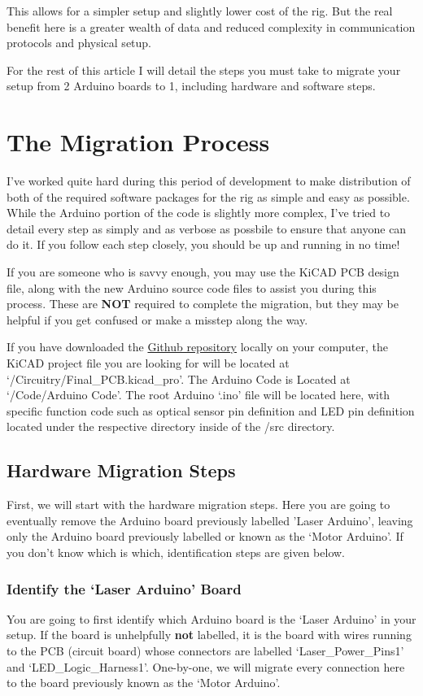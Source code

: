 \documentclass{article}
\begin{document}
This allows for a simpler setup and slightly lower cost of the rig. But the real benefit here is a greater wealth of data and reduced complexity in communication protocols and physical setup. 

For the rest of this article I will detail the steps you must take to migrate your setup from 2 Arduino boards to 1, including hardware and software steps.

\section{The Migration Process}
\label{sec:migration}
I've worked quite hard during this period of development to make distribution of both of the required software packages for the rig as simple and easy as possible. While the Arduino portion of the code is 
slightly more complex, I've tried to detail every step as simply and as verbose as possbile to ensure that anyone can do it. If you follow each step closely, you should be up and running
in no time!

If you are someone who is savvy enough, you may use the KiCAD PCB design file, along with the new Arduino source code files to assist you during this process. These are \textbf{NOT} 
required to complete the migration, but they may be helpful if you get confused or make a misstep along the way. 

If you have downloaded the \href{https://github.com/blakehourigan/Photologic-Experiment-Rig}{Github repository} locally on your computer, the KiCAD project 
file you are looking for will be located at `/Circuitry/Final\_PCB.kicad\_pro'. The Arduino Code is Located at `/Code/Arduino Code'. The root Arduino `.ino' file will be located here, 
with specific function code such as optical sensor pin definition and LED pin definition located under the respective directory inside of the /src directory.

\subsection{Hardware Migration Steps}
First, we will start with the hardware migration steps. Here you are going to eventually remove the Arduino board previously labelled 'Laser Arduino', leaving only the Arduino board previously 
labelled or known as the `Motor Arduino'. If you don't know which is which, identification steps are given below. 

\subsubsection{Identify the `Laser Arduino' Board}
You are going to first identify which Arduino board is the `Laser Arduino' in your setup. If the board is unhelpfully \textbf{not} labelled, it is the board with wires running 
to the PCB (circuit board) whose connectors are labelled 
`Laser\_Power\_Pins1' and `LED\_Logic\_Harness1'. One-by-one, we will migrate every connection here to the board previously known as the `Motor Arduino'.
\end{document}
